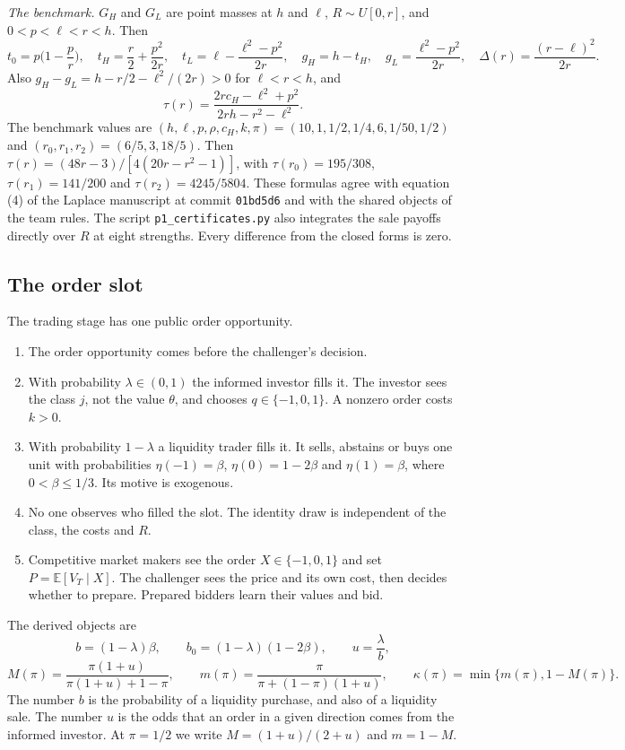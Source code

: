 \documentclass[11pt]{article}
\theoremstyle{definition}
\newcommand{\E}{\mathbb E}
\begin{document}
\emph{The benchmark.} $G_H$ and $G_L$ are point masses at $h$ and $\ell$, $R\sim U[0,r]$, and $0<p<\ell<r<h$. Then
\[
t_0=p\Big(1-\frac pr\Big),\quad t_H=\frac r2+\frac{p^2}{2r},\quad t_L=\ell-\frac{\ell^2-p^2}{2r},\quad
g_H=h-t_H,\quad g_L=\frac{\ell^2-p^2}{2r},\quad \Delta(r)=\frac{(r-\ell)^2}{2r}.
\]
Also $g_H-g_L=h-r/2-\ell^2/(2r)>0$ for $\ell<r<h$, and
\[
\tau(r)=\frac{2rc_H-\ell^2+p^2}{2rh-r^2-\ell^2}.
\]
The benchmark values are $(h,\ell,p,\rho,c_H,k,\pi)=(10,1,1/2,1/4,6,1/50,1/2)$ and $(r_0,r_1,r_2)=(6/5,3,18/5)$.
Then $\tau(r)=(48r-3)/[4(20r-r^2-1)]$, with $\tau(r_0)=195/308$, $\tau(r_1)=141/200$ and $\tau(r_2)=4245/5804$.
These formulas agree with equation (4) of the Laplace manuscript at commit \texttt{01bd5d6} and with the
shared objects of the team rules. The script \texttt{p1\_certificates.py} also integrates the sale payoffs
directly over $R$ at eight strengths. Every difference from the closed forms is zero.

\subsection{The order slot}

The trading stage has one public order opportunity.
\begin{enumerate}
\item The order opportunity comes before the challenger's decision.
\item With probability $\lambda\in(0,1)$ the informed investor fills it. The investor sees the class $j$, not
  the value $\theta$, and chooses $q\in\{-1,0,1\}$. A nonzero order costs $k>0$.
\item With probability $1-\lambda$ a liquidity trader fills it. It sells, abstains or buys one unit with
  probabilities $\eta(-1)=\beta$, $\eta(0)=1-2\beta$ and $\eta(1)=\beta$, where $0<\beta\le 1/3$. Its motive is exogenous.
\item No one observes who filled the slot. The identity draw is independent of the class, the costs and $R$.
\item Competitive market makers see the order $X\in\{-1,0,1\}$ and set $P=\E[V_T\mid X]$. The challenger sees
  the price and its own cost, then decides whether to prepare. Prepared bidders learn their values and bid.
\end{enumerate}
The derived objects are
\[
b=(1-\lambda)\beta,\qquad b_0=(1-\lambda)(1-2\beta),\qquad u=\frac{\lambda}{b},
\]
\[
M(\pi)=\frac{\pi(1+u)}{\pi(1+u)+1-\pi},\qquad m(\pi)=\frac{\pi}{\pi+(1-\pi)(1+u)},\qquad
\kappa(\pi)=\min\{m(\pi),1-M(\pi)\}.
\]
The number $b$ is the probability of a liquidity purchase, and also of a liquidity sale. The number $u$ is the
odds that an order in a given direction comes from the informed investor. At $\pi=1/2$ we write $M=(1+u)/(2+u)$
and $m=1-M$.
\end{document}
